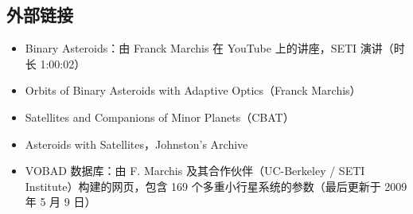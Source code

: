 \subsection{外部链接}
\begin{itemize}
\item Binary Asteroids：由 Franck Marchis 在 YouTube 上的讲座，SETI 演讲（时长 1:00:02）
\item Orbits of Binary Asteroids with Adaptive Optics（Franck Marchis）
\item Satellites and Companions of Minor Planets（CBAT）
\item Asteroids with Satellites，Johnston's Archive
\item VOBAD 数据库：由 F. Marchis 及其合作伙伴（UC-Berkeley / SETI Institute）构建的网页，包含 169 个多重小行星系统的参数（最后更新于 2009 年 5 月 9 日）
\end{itemize}